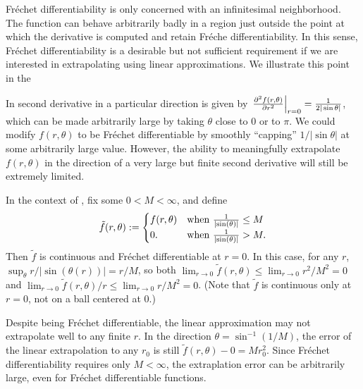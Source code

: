 Fr{\'e}chet differentiability is only concerned with an infinitesimal
neighborhood.  The function can behave arbitrarily badly in a region just
outside the point at which the derivative is computed and retain Fr{\'e}che
differentiability. In this sense, Fr{\'e}chet differentiability is a desirable
but not sufficient requirement if we are interested in extrapolating using
linear approximations.  We illustrate this point in the

\begin{ex}
%
In  second derivative in a particular direction is given
by $\left.\frac{\partial^2 f(r, \theta)}{\partial r^2}\right\vert_{r=0} = \frac{1}{2 |\sin
\theta|}$, which can be made arbitrarily large by taking $\theta$ close to $0$
or to $\pi$.  We could modify $f(r, \theta)$ to be Fr{\'e}chet differentiable by
smoothly ``capping'' $1 / |\sin \theta|$ at some arbitrarily large value.
However, the ability to meaningfully extrapolate $f(r, \theta)$ in the direction
of a very large but finite second derivative will still be extremely limited.

In the context of , fix some $0 < M < \infty$,
and define
%
\begin{align*}
%
\tilde{f}(r, \theta) := \begin{cases}
    f(r, \theta) & \textrm{when }\frac{1}{\abs{\sin(\theta)}} \le M \\
    0. & \textrm{when }\frac{1}{\abs{\sin(\theta)}} > M.
%
\end{cases}
%
\end{align*}
%
Then $\tilde{f}$ is continuous and Fr{\'e}chet differentiable at $r=0$. In this
case, for any $r$, $\sup_{\theta} r / |\sin(\theta(r))| = r / M$, so  both
$\lim_{r \rightarrow 0} \tilde{f}(r, \theta) \le \lim_{r \rightarrow 0} r^2 /
M^2 = 0$ and $\lim_{r \rightarrow 0} \tilde{f}(r, \theta) / r \le \lim_{r
\rightarrow 0}  r / M^2 = 0$.  (Note that $\tilde{f}$ is continuous only
at $r=0$, not on a ball centered at $0$.)

Despite being Fr{\'e}chet differentiable, the linear approximation may not
extrapolate well to any finite $r$.  In the direction $\theta = \sin^{-1}(1 /
M)$, the error of the linear extrapolation to any $r_0$ is still $\tilde{f}(r,
\theta) - 0 = M r_0^2$. Since Fr{\'e}chet differentiability requires only $M <
\infty$, the extraplation error can be arbitrarily large, even for Fr{\'e}chet
differentiable functions.

\end{ex}


